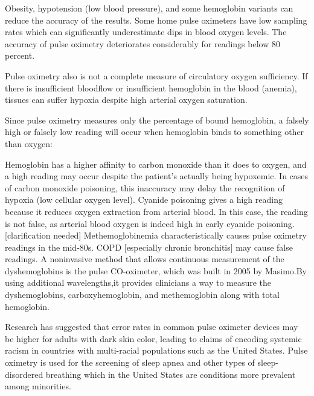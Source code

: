 \documentclass[12pt]{article}
\begin{document}
Obesity, hypotension (low blood pressure), and some hemoglobin variants can reduce the accuracy of the results. Some home pulse oximeters have low sampling rates which can significantly underestimate dips in blood oxygen levels. The accuracy of pulse oximetry deteriorates considerably for readings below 80 percent.

Pulse oximetry also is not a complete measure of circulatory oxygen sufficiency. If there is insufficient bloodflow or insufficient hemoglobin in the blood (anemia), tissues can suffer hypoxia despite high arterial oxygen saturation.

Since pulse oximetry measures only the percentage of bound hemoglobin, a falsely high or falsely low reading will occur when hemoglobin binds to something other than oxygen:

Hemoglobin has a higher affinity to carbon monoxide than it does to oxygen, and a high reading may occur despite the patient's actually being hypoxemic. In cases of carbon monoxide poisoning, this inaccuracy may delay the recognition of hypoxia (low cellular oxygen level).
Cyanide poisoning gives a high reading because it reduces oxygen extraction from arterial blood. In this case, the reading is not false, as arterial blood oxygen is indeed high in early cyanide poisoning.[clarification needed]
Methemoglobinemia characteristically causes pulse oximetry readings in the mid-80s.
COPD [especially chronic bronchitis] may cause false readings.
A noninvasive method that allows continuous measurement of the dyshemoglobins is the pulse CO-oximeter, which was built in 2005 by Masimo.By using additional wavelengths,it provides clinicians a way to measure the dyshemoglobins, carboxyhemoglobin, and methemoglobin along with total hemoglobin.

Research has suggested that error rates in common pulse oximeter devices may be higher for adults with dark skin color, leading to claims of encoding systemic racism in countries with multi-racial populations such as the United States. Pulse oximetry is used for the screening of sleep apnea and other types of sleep-disordered breathing which in the United States are conditions more prevalent among minorities.
\end{document}
